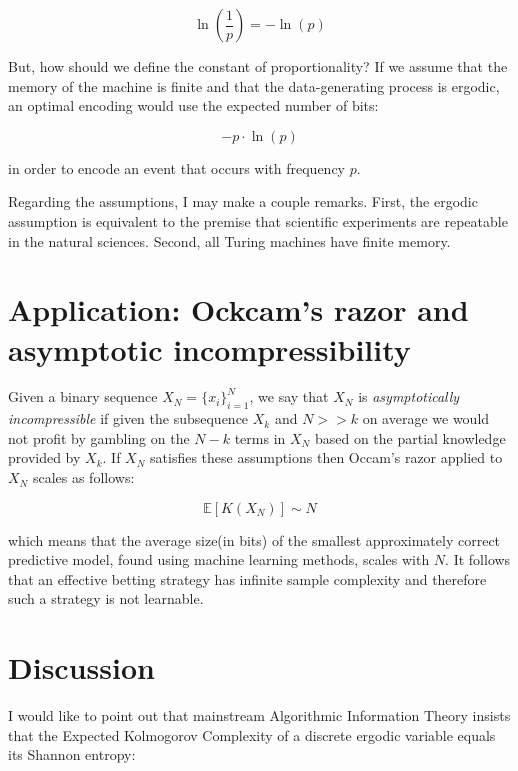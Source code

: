 \documentclass{article}
\begin{document}
\begin{equation}
\ln(\frac{1}{p}) = - \ln(p)
\end{equation}

But, how should we define the constant of proportionality? If we assume that the memory of the machine is finite and that
the data-generating process is ergodic, an optimal encoding would use the expected number of bits:

\begin{equation}
-p \cdot \ln(p)
\end{equation}

in order to encode an event that occurs with frequency $p$.

Regarding the assumptions, I may make a couple remarks. First, the ergodic assumption is equivalent to the premise that
scientific experiments are repeatable in the natural sciences. Second, all Turing machines have finite
memory.

\newpage 

\section{Application: Ockcam's razor and asymptotic incompressibility}

Given a binary sequence $X_N = \{x_i\}_{i=1}^N$, we say that $X_N$ is \textit{asymptotically incompressible} if given the subsequence $X_k$ and $N >>k$ 
on average we would not profit by gambling on the $N-k$ terms in $X_N$ based 
on the partial knowledge provided by $X_k$. If $X_N$ satisfies these assumptions then Occam's razor applied to $X_N$ scales as follows: 

\begin{equation}
\mathbb{E}[K(X_N)] \sim N	
\end{equation}

which means that the average size(in bits) of the smallest approximately correct predictive model, found using machine learning methods, scales with $N$. It follows that an effective betting strategy has infinite sample complexity and therefore such a strategy is not learnable.  

\section{Discussion}

I would like to point out that mainstream Algorithmic Information Theory insists that the Expected Kolmogorov Complexity
of a discrete ergodic variable equals its Shannon entropy:
\end{document}
